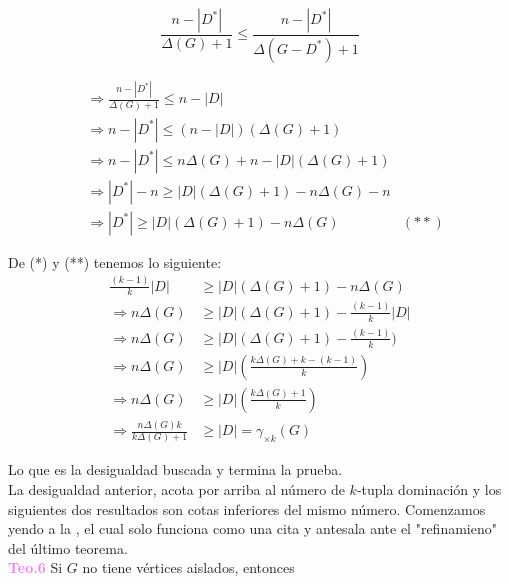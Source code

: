 \documentclass{article}
\begin{document}
$$\frac{n-|D^*|}{\Delta(G)+1}\leq \frac{n-|D^*|}{\Delta(G-D^*)+1}$$



\begin{align*}
&\Longrightarrow\frac{n-|D^*|}{\Delta(G)+1}\leq n-|D| \\
&\Longrightarrow n-|D^*|\leq (n-|D|)(\Delta(G)+1)\\
& \Longrightarrow n-|D^*| \leq n\Delta(G)+n-|D|(\Delta(G)+1)\\
& \Longrightarrow |D^*|-n \geq |D|(\Delta(G)+1)-n\Delta(G)-n\\
& \Longrightarrow |D^*| \geq |D|(\Delta(G)+1)-n\Delta(G) & (**)
\end{align*}

De (*) y (**) tenemos lo siguiente:\\
\begin{align*}
\frac{(k-1)}{k}|D|&\geq |D|(\Delta(G)+1)-n\Delta(G)\\
\Longrightarrow n\Delta(G)&\geq |D|(\Delta(G)+1)-\frac{(k-1)}{k}|D|\\
\Longrightarrow n\Delta(G)&\geq |D|(\Delta(G)+1)-\frac{(k-1)}{k})\\
\Longrightarrow n\Delta(G)&\geq |D|(\frac{k\Delta(G)+k-(k-1)}{k})\\
\Longrightarrow n\Delta(G)&\geq|D|(\frac{k\Delta(G)+1}{k})\\
\Longrightarrow \frac{n\Delta(G)k}{k\Delta(G)+1}&\geq |D| = \gamma_{\times k}(G)
\end{align*}


Lo que es la desigualdad buscada y termina la prueba.\\

La desigualdad anterior, acota por arriba al número de $k$-tupla dominación y los siguientes dos resultados son cotas inferiores del mismo número. Comenzamos yendo a la \cite{harary2000double}, el cual solo funciona como una cita y antesala ante el "refinamieno" del último teorema.\\




\textcolor{Violet}{\textbf{Teo.6}} Si $G$ no tiene vértices aislados, entonces\\
\end{document}
